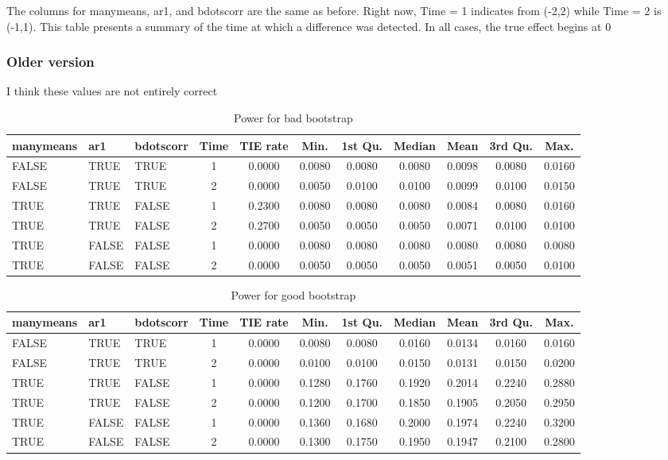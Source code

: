 \documentclass{article}
\begin{document}
The columns for manymeans, ar1, and bdotscorr are the same as before. Right now, Time = 1 indicates from (-2,2) while Time = 2 is (-1,1). This table presents a summary of the time at which a difference was detected. In all cases, the true effect begins at 0

\subsubsection{Older version}

I think these values are not entirely correct

\begin{table}[H]
\centering
\begin{tabular}{lllcccccccc}
  \hline
manymeans & ar1 & bdotscorr & Time & TIE rate & Min. & 1st Qu. & Median & Mean & 3rd Qu. & Max. \\ 
   \hline
FALSE & TRUE & TRUE &     1 & 0.0000 & 0.0080 & 0.0080 & 0.0080 & 0.0098 & 0.0080 & 0.0160 \\ 
  FALSE & TRUE & TRUE &     2 & 0.0000 & 0.0050 & 0.0100 & 0.0100 & 0.0099 & 0.0100 & 0.0150 \\ 
  TRUE & TRUE & FALSE &     1 & 0.2300 & 0.0080 & 0.0080 & 0.0080 & 0.0084 & 0.0080 & 0.0160 \\ 
  TRUE & TRUE & FALSE &     2 & 0.2700 & 0.0050 & 0.0050 & 0.0050 & 0.0071 & 0.0100 & 0.0100 \\ 
  TRUE & FALSE & FALSE &     1 & 0.0000 & 0.0080 & 0.0080 & 0.0080 & 0.0080 & 0.0080 & 0.0080 \\ 
  TRUE & FALSE & FALSE &     2 & 0.0000 & 0.0050 & 0.0050 & 0.0050 & 0.0051 & 0.0050 & 0.0100 \\ 
   \hline
\end{tabular}
\caption{Power for bad bootstrap} 
\label{tab:bad_boot_pwr}
\end{table}

\begin{table}[H]
\centering
\begin{tabular}{lllcccccccc}
  \hline
manymeans & ar1 & bdotscorr & Time & TIE rate & Min. & 1st Qu. & Median & Mean & 3rd Qu. & Max. \\ 
 \hline
FALSE & TRUE & TRUE &     1 & 0.0000 & 0.0080 & 0.0080 & 0.0160 & 0.0134 & 0.0160 & 0.0160 \\ 
  FALSE & TRUE & TRUE &     2 & 0.0000 & 0.0100 & 0.0100 & 0.0150 & 0.0131 & 0.0150 & 0.0200 \\ 
  TRUE & TRUE & FALSE &     1 & 0.0000 & 0.1280 & 0.1760 & 0.1920 & 0.2014 & 0.2240 & 0.2880 \\ 
  TRUE & TRUE & FALSE &     2 & 0.0000 & 0.1200 & 0.1700 & 0.1850 & 0.1905 & 0.2050 & 0.2950 \\ 
  TRUE & FALSE & FALSE &     1 & 0.0000 & 0.1360 & 0.1680 & 0.2000 & 0.1974 & 0.2240 & 0.3200 \\ 
  TRUE & FALSE & FALSE &     2 & 0.0000 & 0.1300 & 0.1750 & 0.1950 & 0.1947 & 0.2100 & 0.2800 \\ 
   \hline
\end{tabular}
\caption{Power for good bootstrap} 
\label{tab:good_boot_pwr}
\end{table}
\end{document}
